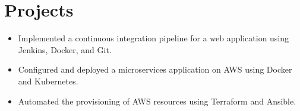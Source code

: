 \documentclass[11pt,a4paper]{moderncv}
\begin{document}
\section{ Projects}%

\begin{itemize}	
	\item Implemented a continuous integration pipeline for a web application using Jenkins, Docker, and Git.
	\item Configured and deployed a microservices application on AWS using Docker and Kubernetes.
	\item Automated the provisioning of AWS resources using Terraform and Ansible.
	
	
	
		
   
	
\end{itemize}
\end{document}

